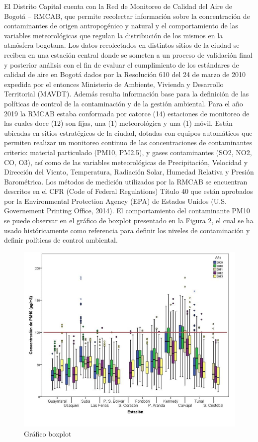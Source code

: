 El Distrito Capital cuenta con la Red de Monitoreo de Calidad del Aire de Bogotá – RMCAB, que permite recolectar información sobre la concentración de contaminantes de origen antropogénico y natural y el comportamiento de las variables meteorológicas que regulan la distribución de los mismos en la atmósfera bogotana.
Los datos recolectados en distintos sitios de la ciudad se reciben en una estación central donde se someten a un proceso de validación final y posterior análisis con el fin de evaluar el cumplimiento de los estándares de calidad de aire en Bogotá dados por la Resolución 610 del 24 de marzo de 2010 expedida por el entonces Ministerio de Ambiente, Vivienda y Desarrollo Territorial (MAVDT). Además resulta información base para la definición de las políticas de control de la contaminación y de la gestión ambiental.
Para el año 2019 la RMCAB estaba conformada por catorce (14) estaciones de monitoreo de las cuales doce (12) son fijas, una (1) meteorológica y una (1) móvil. Están ubicadas en sitios estratégicos de la ciudad, dotadas con equipos automáticos que permiten realizar un monitoreo continuo de las concentraciones de contaminantes criterio: material particulado (PM10, PM2.5), y gases contaminantes (SO2, NO2, CO, O3), así como de las variables meteorológicas de Precipitación, Velocidad y Dirección del Viento, Temperatura, Radiación Solar, Humedad Relativa y Presión Barométrica.
Los métodos de medición utilizados por la RMCAB se encuentran descritos en el CFR (Code of Federal Regulations) Título 40 que están aprobados por la Environmental Protection Agency (EPA) de Estados Unidos (U.S. Governement Printing Office, 2014).
El comportamiento del contaminante PM10 se puede observar en el gráfico de boxplot presentado en la Figura 2, el cual se ha usado históricamente como referencia para definir los niveles de contaminación y definir políticas de control ambiental.

\begin{figure}[h]
	\centering
	\includegraphics[scale=0.8]{images/BoxPlot.png}
	\caption{Gráfico boxplot}
\end{figure}

